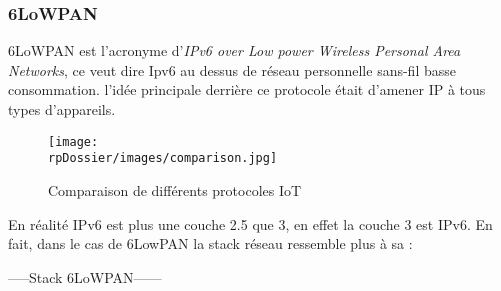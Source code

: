 \subsubsection{6LoWPAN}

6LoWPAN est l'acronyme d'\textit{IPv6 over Low power Wireless Personal Area Networks}, ce veut dire Ipv6 au dessus de réseau personnelle sans-fil basse consommation. l'idée principale derrière ce protocole était d'amener IP à tous types d'appareils. 


\begin{figure}[h]
\begin{center}
\texttt{[image: \\rpDossier/images/comparison.jpg]}
\end{center}
\caption{Comparaison de différents protocoles IoT}
\label{comparison}
\end{figure}

En réalité IPv6 est plus une couche 2.5 que 3, en effet la couche 3 est IPv6. En fait, dans le cas de 6LowPAN la stack réseau ressemble plus à sa :

-----Stack 6LoWPAN------



